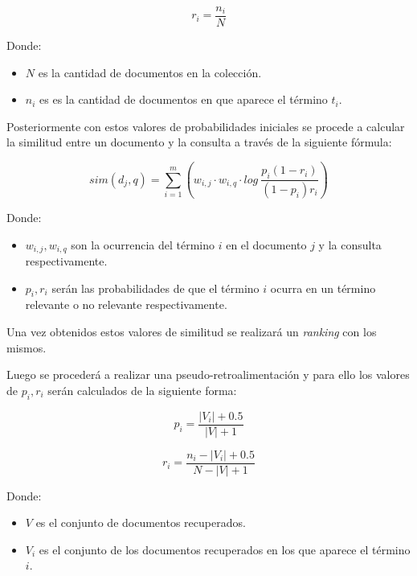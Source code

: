 \documentclass[spanish]{article}
\begin{document}
			\begin{equation}\label{key}
				\displaystyle r_i = \frac{n_i}{N}
			\end{equation}

			Donde: 
			\begin{itemize}
				\item $ N $ es la cantidad de documentos en la colección.

				\item $ n_i $ es es la cantidad de documentos en que aparece el término $ t_i $.
			\end{itemize}

			Posteriormente con estos valores de probabilidades iniciales se procede a calcular la similitud entre un documento y la consulta a través de la siguiente fórmula:
	
			\begin{equation}
				\displaystyle sim(d_j,q) = \sum_{i=1}^m \left( w_{i,j} \cdot w_{i,q} \cdot log⁡ \ \frac{p_i (1 - r_i)}{(1- p_i ) r_i} \right)
			\end{equation}

			Donde:
			\begin{itemize}
				\item $ w_{i,j}, w_{i,q} $ son la ocurrencia del término $ i $ en el documento $ j $ y la consulta respectivamente.

				\item $ p_i, r_i $ serán las probabilidades de que el término $ i $ ocurra en un término relevante o no relevante respectivamente.
			\end{itemize}

			Una vez obtenidos estos valores de similitud se realizará un \emph{ranking} con los mismos. 

			Luego se procederá a realizar una pseudo-retroalimentación y para ello los valores de $ p_i, r_i $ serán calculados de la siguiente forma:

			\begin{equation}
				p_i = \frac{|V_i| + 0.5}{|V| + 1}
			\end{equation}
			
			\begin{equation}
				\displaystyle r_i = \frac{n_i - |V_i| + 0.5}{N - |V| + 1}
			\end{equation}
			
			Donde:

			\begin{itemize}
				\item $ V $ es el conjunto de documentos recuperados.
				\item $ V_i $ es el conjunto de los documentos recuperados en los que aparece el término $ i $.
			\end{itemize}
\end{document}
